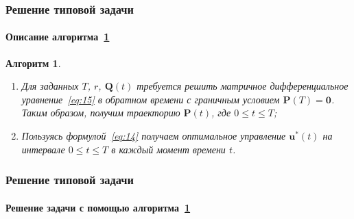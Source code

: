\documentclass[ignorenonframetext,hyperref={pdftex,unicode,pdfpagelabels=false},compress]{beamer}
\newtheorem{alg}{Алгоритм}
\begin{document}
\begin{frame}
    \frametitle{Решение типовой задачи}
    \framesubtitle{Описание алгоритма~\ref{alg:1}}

    \begin{alg}\label{alg:1}~
        \begin{enumerate}
            \item
                Для заданных $T$, $r$, $\mathbf{Q}(t)$ требуется решить матричное дифференциальное уравнение~\ref{eq:15} в обратном времени с граничным условием $\mathbf{P}(T) = \mathbf{0}$. Таким образом, получим траекторию $\mathbf{P}(t)$, где $0 \leqslant t \leqslant T$;

            \item
                Пользуясь формулой~\ref{eq:14} получаем оптимальное управление $\mathbf{u}^*(t)$ на интервале $0 \leqslant t \leqslant T$ в каждый момент времени $t$.
        \end{enumerate}
    \end{alg}
\end{frame}



\begin{frame}
    \frametitle{Решение типовой задачи}
    \framesubtitle{Решение задачи с помощью алгоритма~\ref{alg:1}}

    \begin{figure}\center
        
        \label{fig:alg1}
    \end{figure}
\end{frame}
\end{document}
